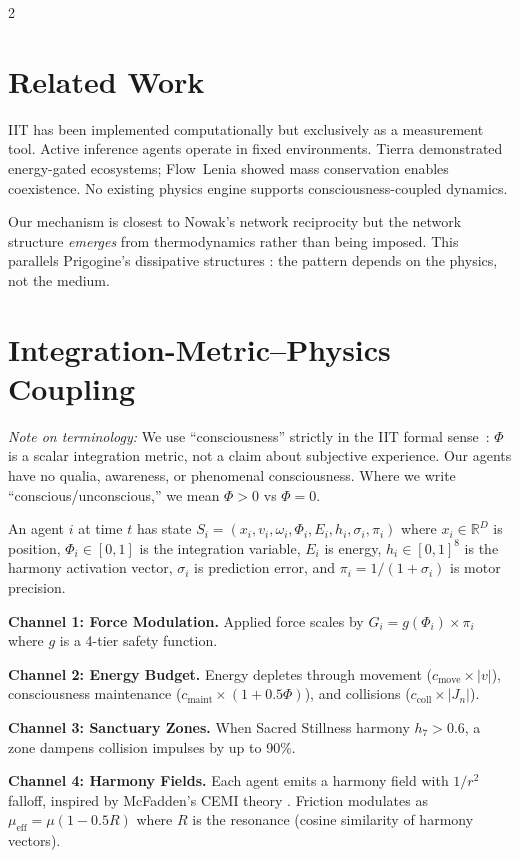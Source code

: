 \documentclass[letterpaper]{article}
\begin{document}
\begin{multicols}{2}
\section{Related Work}

IIT has been implemented computationally \citep{oizumi2014} but exclusively as a measurement tool. Active inference agents \citep{piolopez2016,fountas2020} operate in fixed environments. Tierra \citep{ray1991} demonstrated energy-gated ecosystems; Flow~Lenia \citep{plantec2023} showed mass conservation enables coexistence. No existing physics engine supports consciousness-coupled dynamics.

Our mechanism is closest to Nowak's network reciprocity \citep{nowak2006} but the network structure \emph{emerges} from thermodynamics rather than being imposed. This parallels Prigogine's dissipative structures \citep{prigogine1977}: the pattern depends on the physics, not the medium.

\section{Integration-Metric--Physics Coupling}

\emph{Note on terminology:} We use ``consciousness'' strictly in the IIT formal sense~\citep{tononi2004}: $\Phi$ is a scalar integration metric, not a claim about subjective experience. Our agents have no qualia, awareness, or phenomenal consciousness. Where we write ``conscious/unconscious,'' we mean $\Phi > 0$ vs $\Phi = 0$.

An agent $i$ at time $t$ has state $S_i = (x_i, v_i, \omega_i, \Phi_i, E_i, h_i, \sigma_i, \pi_i)$ where $x_i \in \mathbb{R}^D$ is position, $\Phi_i \in [0,1]$ is the integration variable, $E_i$ is energy, $h_i \in [0,1]^8$ is the harmony activation vector, $\sigma_i$ is prediction error, and $\pi_i = 1/(1+\sigma_i)$ is motor precision.

\textbf{Channel 1: Force Modulation.} Applied force scales by $G_i = g(\Phi_i) \times \pi_i$ where $g$ is a 4-tier safety function.

\textbf{Channel 2: Energy Budget.} Energy depletes through movement ($c_{\text{move}} \times |v|$), consciousness maintenance ($c_{\text{maint}} \times (1+0.5\Phi)$), and collisions ($c_{\text{coll}} \times |J_n|$).

\textbf{Channel 3: Sanctuary Zones.} When Sacred Stillness harmony $h_7 > 0.6$, a zone dampens collision impulses by up to 90\%.

\textbf{Channel 4: Harmony Fields.} Each agent emits a harmony field with $1/r^2$ falloff, inspired by McFadden's CEMI theory \citep{mcfadden2020}. Friction modulates as $\mu_{\text{eff}} = \mu(1 - 0.5R)$ where $R$ is the resonance (cosine similarity of harmony vectors).


\end{multicols}
\end{document}
